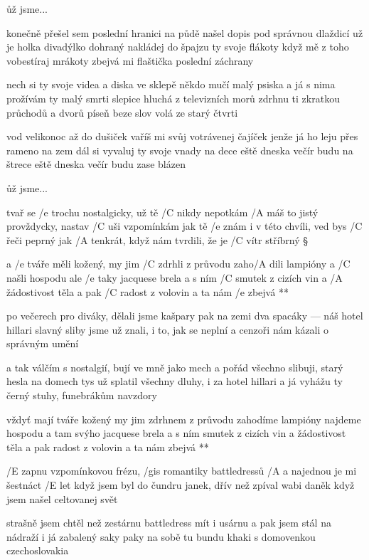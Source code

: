 \r už jsme...

konečně přešel sem poslední hranici
na půdě našel dopis pod správnou dlaždicí
už je holka divadýlko dohraný
nakládej do špajzu ty svoje flákoty
když mě z toho vobestíraj mrákoty
zbejvá mi flaštička poslední záchrany \s

nech si ty svoje videa a diska
ve sklepě někdo mučí malý psiska
a já s nima prožívám ty malý smrti
slepice hluchá z televizních morů
zdrhnu ti zkratkou průchodů a dvorů
píseň beze slov volá ze starý čtvrti \s

vod velikonoc až do dušiček
vaříš mi svůj votrávenej čajíček
jenže já ho leju přes rameno na zem
dál si vyvaluj ty svoje vnady na dece
eště dneska večír budu na štrece
eště dneska večír budu zase blázen \s

\r už jsme...




tvař se /e trochu nostalgicky, už tě /C nikdy nepotkám
/A máš to jistý provždycky, nastav /C uši vzpomínkám
jak tě /e znám i v této chvíli, ved bys /C řeči peprný
jak /A tenkrát, když nám tvrdili, že je /C vítr stříbrný \S

\R a /e tváře měli kožený, my jim /C zdrhli z průvodu
   zaho/A dili lampióny a /C našli hospodu
   ale /e taky jacquese brela a s ním /C smutek z cizích vin
   a /A žádostivost těla a pak /C radost z volovin
   a ta nám /e zbejvá **

po večerech pro diváky, dělali jsme kašpary
pak na zemi dva spacáky --- náš hotel hillari
slavný sliby jsme už znali, i to, jak se neplní
a cenzoři nám kázali o správným umění \s

a tak válčím s nostalgií, bují ve mně jako mech
a pořád všechno slibuji, starý hesla na domech
tys už splatil všechny dluhy, i za hotel hillari
a já vyhážu ty černý stuhy, funebrákům navzdory \s

\R vždyť mají tváře kožený my jim zdrhnem z průvodu
   zahodíme lampióny najdeme hospodu
   a tam svýho jacquese brela a s ním smutek z cizích vin
   a žádostivost těla a pak radost z volovin
   a ta nám zbejvá **




/E zapnu vzpomínkovou frézu, /gis romantiky battledressů
/A a najednou je mi šestnáct /E let \s
když jsem byl do čundru janek, dřív než zpíval wabi daněk
když jsem našel celtovanej svět \s

strašně jsem chtěl než zestárnu battledress mít i usárnu
a pak jsem stál na nádraží i já
zabalený saky paky na sobě tu bundu khaki
s domovenkou czechoslovakia \s

